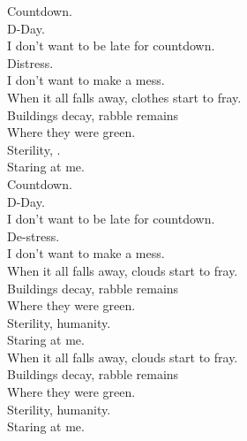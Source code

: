 
\label{album:sketches-of-brunswick-east}









Countdown. \\
D-Day. \\
I don't want to be late for countdown. \\
Distress. \\
I don't want to make a mess. \\

When it all falls away, clothes start to fray. \\
Buildings decay, rabble remains \\
Where they were green. \\
Sterility, . \\
Staring at me. \\

Countdown. \\
D-Day. \\
I don't want to be late for countdown. \\
De-stress. \\
I don't want to make a mess. \\

When it all falls away, clouds start to fray. \\
Buildings decay, rabble remains \\
Where they were green. \\
Sterility, humanity. \\
Staring at me. \\

When it all falls away, clouds start to fray. \\
Buildings decay, rabble remains \\
Where they were green. \\
Sterility, humanity. \\
Staring at me. \\

